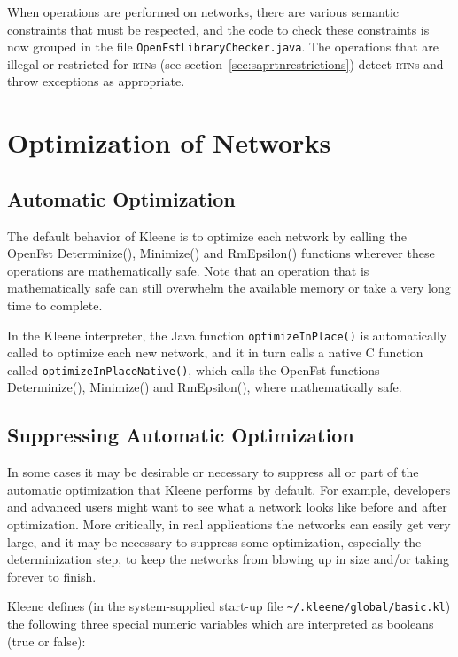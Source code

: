 \documentclass[letterpaper,12pt]{article}
\newcommand{\acro}{\textsc}
\def\CPP{{C\nolinebreak[4]\hspace{-.08em}\raisebox{.3ex}{\footnotesize\bf
+}\nolinebreak\hspace{-.1em}\raisebox{.3ex}{\footnotesize\bf +}}}
\begin{document}
When operations are performed on networks, there are various semantic
constraints that must be respected, and the code to check these
constraints is now grouped in the file
\texttt{OpenFstLibraryChecker.java}.  The operations that are illegal or
restricted for \acro{rtn}s (see section~\ref{sec:saprtnrestrictions})
detect \acro{rtn}s and throw exceptions as appropriate.

\newpage
\section{Optimization of Networks}

\label{app:optimize}

\subsection{Automatic Optimization}

The default behavior of Kleene is to optimize each network by calling
the OpenFst Determinize(), Minimize() and RmEpsilon() functions wherever
these operations are mathematically safe.  Note that an operation that is
mathematically safe can still overwhelm the available memory or
take a very long time to complete.

In the Kleene interpreter, the Java function \texttt{optimizeInPlace()}
is automatically called to optimize each new network, and it in turn
calls a native \CPP{} function called \texttt{optimizeInPlaceNative()},
which calls the OpenFst functions 
Determinize(), Minimize() and RmEpsilon(), where
mathematically safe.

\subsection{Suppressing Automatic Optimization}

In some cases it may be desirable or necessary to suppress all or part of
the automatic optimization that Kleene performs by default.  For example,
developers and advanced users might want to see what a network looks like
before and after optimization.  More critically, in real applications the
networks can easily get very large, and it may be necessary to suppress
some optimization, especially the determinization step, to keep the
networks from blowing up in size and/or taking forever to finish.

Kleene defines (in the system-supplied 
start-up file \verb!~/.kleene/global/basic.kl!) the following three
special numeric variables which are interpreted as booleans (true or
false):
\end{document}
